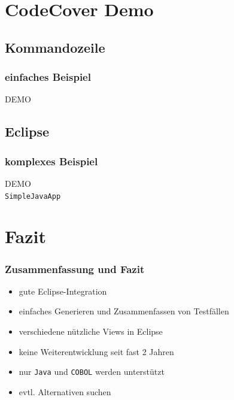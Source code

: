 \documentclass{beamer}
\begin{document}
  \section{CodeCover Demo}
  \subsection{Kommandozeile}
  \begin{frame}\frametitle{einfaches Beispiel}
    \centering \Huge{DEMO}\\
  \end{frame}

  \subsection{Eclipse}
  \begin{frame}\frametitle{komplexes Beispiel}
    \centering
    \Huge{DEMO}\\
    \centering
    \normalsize{\texttt{SimpleJavaApp}}\\
  \end{frame}


  \section{Fazit}
  \begin{frame}\frametitle{Zusammenfassung und Fazit}
    \begin{itemize}
      \item gute Eclipse-Integration
      \item einfaches Generieren und Zusammenfassen von Testfällen
      \item verschiedene nützliche Views in Eclipse
      \item keine Weiterentwicklung seit fast 2 Jahren
      \item nur \texttt{Java} und \texttt{COBOL} werden unterstützt
      \item evtl. Alternativen suchen
    \end{itemize}
  \end{frame}
\end{document}
